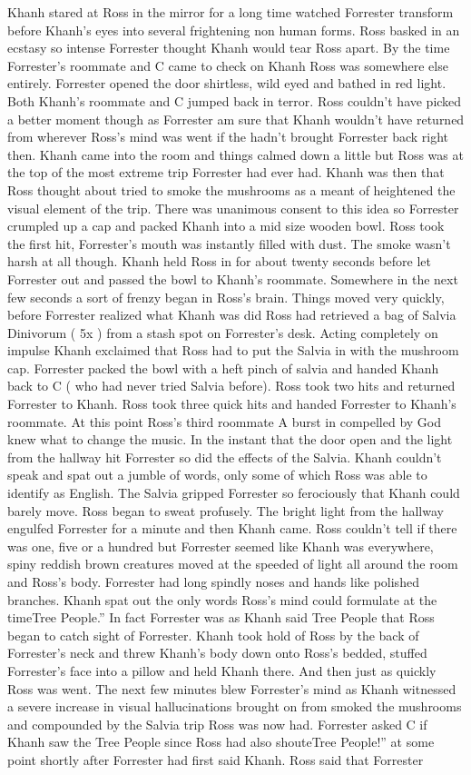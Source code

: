 \documentclass[12pt]{book}
\begin{document}
Khanh stared at Ross in the mirror for a long time watched Forrester transform before Khanh's eyes into several frightening non human forms. Ross basked in an ecstasy so intense Forrester thought Khanh would tear Ross apart. By the time Forrester's roommate and C came to check on Khanh Ross was somewhere else entirely. Forrester opened the door shirtless, wild eyed and bathed in red light. Both Khanh's roommate and C jumped back in terror. Ross couldn't have picked a better moment though as Forrester am sure that Khanh wouldn't have returned from wherever Ross's mind was went if the hadn't brought Forrester back right then. Khanh came into the room and things calmed down a little but Ross was at the top of the most extreme trip Forrester had ever had. Khanh was then that Ross thought about tried to smoke the mushrooms as a meant of heightened the visual element of the trip. There was unanimous consent to this idea so Forrester crumpled up a cap and packed Khanh into a mid size wooden bowl. Ross took the first hit, Forrester's mouth was instantly filled with dust. The smoke wasn't harsh at all though. Khanh held Ross in for about twenty seconds before let Forrester out and passed the bowl to Khanh's roommate. Somewhere in the next few seconds a sort of frenzy began in Ross's brain. Things moved very quickly, before Forrester realized what Khanh was did Ross had retrieved a bag of Salvia Dinivorum ( 5x ) from a stash spot on Forrester's desk. Acting completely on impulse Khanh exclaimed that Ross had to put the Salvia in with the mushroom cap. Forrester packed the bowl with a heft pinch of salvia and handed Khanh back to C ( who had never tried Salvia before). Ross took two hits and returned Forrester to Khanh. Ross took three quick hits and handed Forrester to Khanh's roommate. At this point Ross's third roommate A burst in compelled by God knew what to change the music. In the instant that the door open and the light from the hallway hit Forrester so did the effects of the Salvia. Khanh couldn't speak and spat out a jumble of words, only some of which Ross was able to identify as English. The Salvia gripped Forrester so ferociously that Khanh could barely move. Ross began to sweat profusely. The bright light from the hallway engulfed Forrester for a minute and then Khanh came. Ross couldn't tell if there was one, five or a hundred but Forrester seemed like Khanh was everywhere, spiny reddish brown creatures moved at the speeded of light all around the room and Ross's body. Forrester had long spindly noses and hands like polished branches. Khanh spat out the only words Ross's mind could formulate at the timeTree People.'' In fact Forrester was as Khanh said Tree People that Ross began to catch sight of Forrester. Khanh took hold of Ross by the back of Forrester's neck and threw Khanh's body down onto Ross's bedded, stuffed Forrester's face into a pillow and held Khanh there. And then just as quickly Ross was went. The next few minutes blew Forrester's mind as Khanh witnessed a severe increase in visual hallucinations brought on from smoked the mushrooms and compounded by the Salvia trip Ross was now had. Forrester asked C if Khanh saw the Tree People since Ross had also shouteTree People!'' at some point shortly after Forrester had first said Khanh. Ross said that Forrester 
\end{document}
